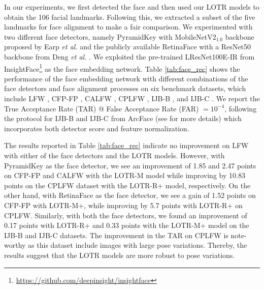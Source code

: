 \documentclass[journal]{IEEEtran}
\begin{document}
In our experiments, we first detected the face and then used our LOTR models to obtain the 106 facial landmarks.
Following this, we extracted a subset of the five landmarks for face alignment to make a fair comparison.
We experimented with two different face detectors, namely PyramidKey with MobileNetV2$_{1.0}$ backbone proposed by Earp \textit{et al.} \cite{earp2019} and the publicly available RetinaFace with a ResNet50 backbone from Deng \textit{et al.} \cite{deng2019}.
We exploited the pre-trained LResNet100E-IR from InsightFace\footnote{\label{footnote:insightface}\href{https://github.com/deepinsight/insightface}{https://github.com/deepinsight/insightface}} as the face embedding network.
Table \ref{tab:face_rec} shows the performance of the face embedding network with different combinations of the face detectors and face alignment processes on six benchmark datasets, which include LFW  \cite{lfw}, CFP-FP \cite{cfp-fp}, CALFW \cite{calfw}, CPLFW \cite{cplfw}, IJB-B \cite{ijbb}, and IJB-C \cite{ijbc}.
We report the True Acceptance Rate (TAR) @ False Acceptance Rate (FAR) $=10^{-4}$, following the protocol for IJB-B and IJB-C from ArcFace (see \cite{deng2018,an2020} for more details)
which incorporates both detector score and feature normalization.

The results reported in Table \ref{tab:face_rec} indicate no improvement on LFW with either of the face detectors and the LOTR models.
However, with PyramidKey as the face detector, we see an improvement of 1.85 and 2.47 points on CFP-FP and CALFW with the LOTR-M model while improving by 10.83 points on the CPLFW dataset with the LOTR-R+ model, respectively.
On the other hand, with RetinaFace as the face detector, we see a gain of 1.52 points on CFP-FP with LOTR-M+, while improving by 5.7 points with LOTR-R+ on CPLFW.
Similarly, with both the face detectors, we found an improvement of 0.17 points with LOTR-R+ and 0.33 points with the LOTR-M+ model on the IJB-B and IJB-C datasets.
The improvement in the TAR on CPLFW is note-worthy as this dataset include images with large pose variations.
Thereby, the results suggest that the LOTR models are more robust to pose variations.
\end{document}
